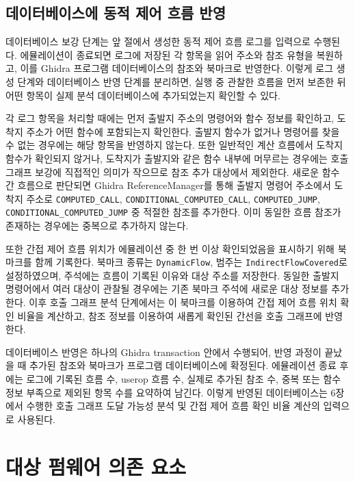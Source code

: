 \documentclass[master,korean,final]{kaist-ucs}
\begin{document}
\subsection{데이터베이스에 동적 제어 흐름 반영}

데이터베이스 보강 단계는 앞 절에서 생성한 동적 제어 흐름 로그를 입력으로 수행된다. 에뮬레이션이 종료되면 로그에 저장된 각 항목을 읽어 주소와 참조 유형을 복원하고, 이를 Ghidra 프로그램 데이터베이스의 참조와 북마크로 반영한다. 이렇게 로그 생성 단계와 데이터베이스 반영 단계를 분리하면, 실행 중 관찰한 흐름을 먼저 보존한 뒤 어떤 항목이 실제 분석 데이터베이스에 추가되었는지 확인할 수 있다.

각 로그 항목을 처리할 때에는 먼저 출발지 주소의 명령어와 함수 정보를 확인하고, 도착지 주소가 어떤 함수에 포함되는지 확인한다. 출발지 함수가 없거나 명령어를 찾을 수 없는 경우에는 해당 항목을 반영하지 않는다. 또한 일반적인 계산 흐름에서 도착지 함수가 확인되지 않거나, 도착지가 출발지와 같은 함수 내부에 머무르는 경우에는 호출 그래프 보강에 직접적인 의미가 작으므로 참조 추가 대상에서 제외한다. 새로운 함수 간 흐름으로 판단되면 Ghidra ReferenceManager를 통해 출발지 명령어 주소에서 도착지 주소로 \texttt{COMPUTED\_CALL}, \texttt{CONDITIONAL\_COMPUTED\_CALL}, \texttt{COMPUTED\_JUMP}, \texttt{CONDITIONAL\_COMPUTED\_JUMP} 중 적절한 참조를 추가한다. 이미 동일한 흐름 참조가 존재하는 경우에는 중복으로 추가하지 않는다.

또한 간접 제어 흐름 위치가 에뮬레이션 중 한 번 이상 확인되었음을 표시하기 위해 북마크를 함께 기록한다. 북마크 종류는 \texttt{DynamicFlow}, 범주는 \texttt{IndirectFlowCovered}로 설정하였으며, 주석에는 흐름이 기록된 이유와 대상 주소를 저장한다. 동일한 출발지 명령어에서 여러 대상이 관찰될 경우에는 기존 북마크 주석에 새로운 대상 정보를 추가한다. 이후 호출 그래프 분석 단계에서는 이 북마크를 이용하여 간접 제어 흐름 위치 확인 비율을 계산하고, 참조 정보를 이용하여 새롭게 확인된 간선을 호출 그래프에 반영한다.

데이터베이스 반영은 하나의 Ghidra transaction 안에서 수행되어, 반영 과정이 끝났을 때 추가된 참조와 북마크가 프로그램 데이터베이스에 확정된다. 에뮬레이션 종료 후에는 로그에 기록된 흐름 수, userop 흐름 수, 실제로 추가된 참조 수, 중복 또는 함수 정보 부족으로 제외된 항목 수를 요약하여 남긴다. 이렇게 반영된 데이터베이스는 6장에서 수행한 호출 그래프 도달 가능성 분석 및 간접 제어 흐름 확인 비율 계산의 입력으로 사용된다.

\section{대상 펌웨어 의존 요소}
\end{document}

